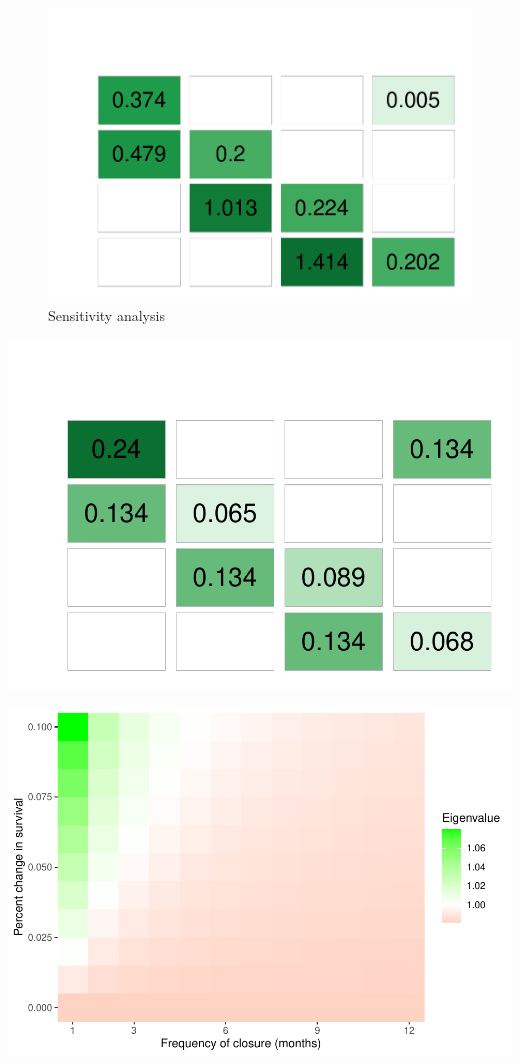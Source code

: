 \documentclass[
]{article}
\begin{document}
\begin{figure}
\centering
\includegraphics{Wulfing_CH1_Draft1_files/figure-latex/sensitivity-1.pdf}
\caption{\label{fig:sensitivity}Sensitivity analysis \label{sensitivity}}
\end{figure}

\includegraphics{Wulfing_CH1_Draft1_files/figure-latex/elasticity-1.pdf}

\includegraphics{Wulfing_CH1_Draft1_files/figure-latex/closures-1.pdf}
\end{document}
